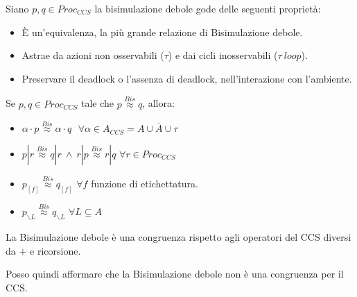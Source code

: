 Siano $p, q \in Proc_{CCS}$ la bisimulazione debole gode delle seguenti proprietà:
\begin{itemize}
    \item È un'equivalenza, la più grande relazione di Bisimulazione debole.
    \item Astrae da azioni non osservabili ($\tau$) e dai cicli inosservabili ($\tau \ loop$).
    \item Preservare il deadlock o l'assenza di deadlock, nell'interazione con l'ambiente.
\end{itemize}
\begin{teorema}
    Se $p, q \in Proc_{CCS}$ tale che $p \stackrel{Bis}{\approx} q$, allora:
    \begin{itemize}
        \item $\alpha \cdot p \stackrel{Bis}{\approx} \alpha \cdot q \ \ \ \forall \alpha \in A_{CCS} = A \cup \overline{A} \cup \tau$
        \item $p | r \stackrel{Bis}{\approx} q | r \ \land \ r | p \stackrel{Bis}{\approx} r | q$ $\forall r \in Proc_{CCS}$
        \item $p_{[f]} \stackrel{Bis}{\approx} q_{[f]}$ $\forall f$ funzione di
              etichettatura.
        \item $p_{\backslash L} \stackrel{Bis}{\approx} q_{\backslash L}$ $\forall L \subseteq A$
    \end{itemize}
    La Bisimulazione debole è una congruenza rispetto agli operatori del CCS
    diversi da $+$ e ricorsione.

    Posso quindi affermare che la Bisimulazione debole non è una congruenza per
    il CCS.
\end{teorema}
